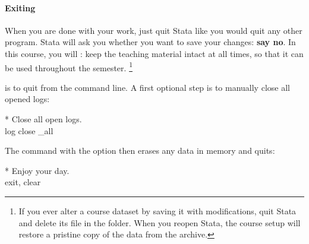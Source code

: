 \paragraph{Exiting}

When you are done with your work, just quit Stata like you would quit any other program. Stata will ask you whether you want to save your changes: \textbf{say no}. In this course, you will : keep the teaching material intact at all times, so that it can be used throughout the semester.%
    \footnote{If you ever alter a course dataset by saving it with modifications, quit Stata and delete its  file in the \data folder. When you reopen Stata, the course setup will restore a pristine copy of the data from the \ZIP archive.}%

 is to quit from the command line. A first optional step is to manually close all opened logs:%

\begin{docspec}
  * Close all open logs.\\%
  log close \_all
\end{docspec}

The  command with the  option then erases any data in memory and quits:%

\begin{docspec}
  * Enjoy your day.\\%
  exit, clear
\end{docspec}
